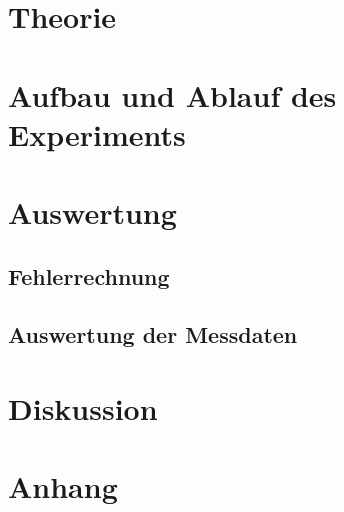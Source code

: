 \documentclass[a4,12pt]{article}
\begin{document}



\tableofcontents
\newpage


\section{Theorie}

\newpage


\section{Aufbau und Ablauf des Experiments}

\newpage


\section{Auswertung}
\subsection{Fehlerrechnung}
\label{sec:Fehlerrechnung}

\newpage
%
\subsection{Auswertung der Messdaten}

\newpage


\section{Diskussion}

\newpage

\section{Anhang}

\end{document}
